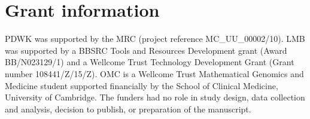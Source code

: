 \documentclass[9pt,a4paper,]{extarticle}
\begin{document}
\hypertarget{grant-information}{%
\section{Grant information}\label{grant-information}}

PDWK was supported by the MRC (project reference MC\_UU\_00002/10). LMB
was supported by a BBSRC Tools and Resources Development grant (Award
BB/N023129/1) and a Wellcome Trust Technology Development Grant (Grant
number 108441/Z/15/Z). OMC is a Wellcome Trust Mathematical Genomics
and Medicine student supported financially by the School of Clinical
Medicine, University of Cambridge. The funders had no role in study
design, data collection and analysis, decision to publish, or
preparation of the manuscript.

\renewcommand\refname{References}
{\small}
\end{document}
